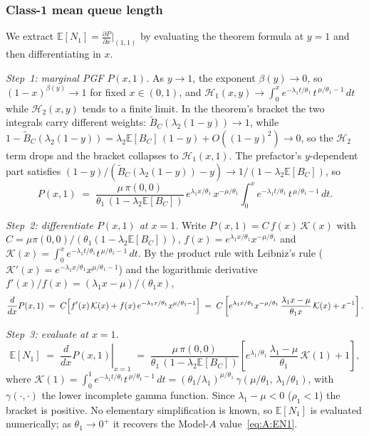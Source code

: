 \documentclass{article}
\numberwithin{equation}{section}
\begin{document}
\subsubsection*{Class-1 mean queue length}

We extract $\mathbb{E}[N_1]=\tfrac{\partial P}{\partial x}\big|_{(1,1)}$ by evaluating the theorem formula at $y=1$ and then differentiating in $x$.

\medskip\noindent\textit{Step~1: marginal PGF $P(x,1)$.}\enspace
As $y\to1$, the exponent $\beta(y)\to0$, so $(1-x)^{\beta(y)}\to1$ for fixed $x\in(0,1)$, and $\mathcal{H}_1(x,y)\to\int_0^x e^{-\lambda_1 t/\theta_1}\,t^{\,\mu/\theta_1-1}\,dt$ while $\mathcal{H}_2(x,y)$ tends to a finite limit. In the theorem's bracket the two integrals carry different weights: $\widetilde{B}_C(\lambda_2(1-y))\to1$, while $1-\widetilde{B}_C(\lambda_2(1-y))=\lambda_2\mathbb{E}[B_C]\,(1-y)+O((1-y)^2)\to0$, so the $\mathcal{H}_2$ term drops and the bracket collapses to $\mathcal{H}_1(x,1)$. The prefactor's $y$-dependent part satisfies $(1-y)/(\widetilde{B}_C(\lambda_2(1-y))-y)\to1/(1-\lambda_2\mathbb{E}[B_C])$, so
\begin{equation*}
    P(x,1)
    \;=\; \frac{\mu\,\pi(0,0)}{\theta_1\,(1-\lambda_2\mathbb{E}[B_C])}\,e^{\lambda_1 x/\theta_1}\,x^{-\mu/\theta_1}
    \int_0^x e^{-\lambda_1 t/\theta_1}\,t^{\,\mu/\theta_1-1}\,dt.
\end{equation*}

\medskip\noindent\textit{Step~2: differentiate $P(x,1)$ at $x=1$.}\enspace
Write $P(x,1)=C\,f(x)\,\mathcal{K}(x)$ with $C=\mu\pi(0,0)/(\theta_1(1-\lambda_2\mathbb{E}[B_C]))$, $f(x)=e^{\lambda_1 x/\theta_1}x^{-\mu/\theta_1}$ and $\mathcal{K}(x)=\int_0^x e^{-\lambda_1 t/\theta_1}t^{\,\mu/\theta_1-1}\,dt$. By the product rule with Leibniz's rule ($\mathcal{K}'(x)=e^{-\lambda_1 x/\theta_1}x^{\mu/\theta_1-1}$) and the logarithmic derivative $f'(x)/f(x)=(\lambda_1 x-\mu)/(\theta_1 x)$,
\begin{equation*}
    \frac{d}{dx}P(x,1)
    \;=\; C\Bigl[f'(x)\,\mathcal{K}(x)+f(x)\,e^{-\lambda_1 x/\theta_1}x^{\mu/\theta_1-1}\Bigr]
    \;=\; C\left[e^{\lambda_1 x/\theta_1}x^{-\mu/\theta_1}\,\frac{\lambda_1 x-\mu}{\theta_1 x}\,\mathcal{K}(x) + x^{-1}\right].
\end{equation*}

\medskip\noindent\textit{Step~3: evaluate at $x=1$.}\enspace
\begin{equation*}
    \mathbb{E}[N_1]
    \;=\; \left.\frac{d}{dx}P(x,1)\right|_{x=1}
    \;=\; \frac{\mu\,\pi(0,0)}{\theta_1\,(1-\lambda_2\mathbb{E}[B_C])}
    \left[e^{\lambda_1/\theta_1}\,\frac{\lambda_1-\mu}{\theta_1}\,\mathcal{K}(1) + 1\right],
\end{equation*}
where $\mathcal{K}(1)=\int_0^1 e^{-\lambda_1 t/\theta_1}t^{\,\mu/\theta_1-1}\,dt=(\theta_1/\lambda_1)^{\mu/\theta_1}\,\gamma(\mu/\theta_1,\,\lambda_1/\theta_1)$, with $\gamma(\cdot,\cdot)$ the lower incomplete gamma function. Since $\lambda_1-\mu<0$ ($\rho_1<1$) the bracket is positive. No elementary simplification is known, so $\mathbb{E}[N_1]$ is evaluated numerically; as $\theta_1\to0^+$ it recovers the Model-$A$ value~\eqref{eq:A:EN1}.
\end{document}
